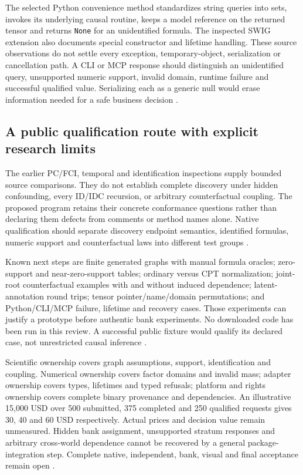 The selected Python convenience method standardizes string queries into
sets, invokes its underlying causal routine, keeps a model reference on the
returned tensor and returns \texttt{None} for an unidentified formula.
The inspected SWIG extension also documents special constructor and lifetime
handling. These source observations do not settle every exception,
temporary-object, serialization or cancellation path. A CLI or MCP response
should distinguish an unidentified query, unsupported numeric support,
invalid domain, runtime failure and successful qualified value. Serializing
each as a generic null would erase information needed for a safe business
decision \cite{exec24_agrum_source,exec24_agrum_choice}.

\subsection{A public qualification route with explicit research limits}
The earlier PC/FCI, temporal and identification inspections supply bounded
source comparisons. They do not establish complete discovery under hidden
confounding, every ID/IDC recursion, or arbitrary counterfactual coupling.
The proposed program retains their concrete conformance questions rather
than declaring them defects from comments or method names alone. Native
qualification should separate discovery endpoint semantics, identified
formulas, numeric support and counterfactual laws into different test groups
\cite{exec13_cxx_agrum,exec14_native_agrum,exec16_ct_agrum,
exec19_cxx_identification_source,exec24_agrum_choice}.

Known next steps are finite generated graphs with manual formula oracles;
zero-support and near-zero-support tables; ordinary versus CPT normalization;
joint-root counterfactual examples with and without induced dependence;
latent-annotation round trips; tensor pointer/name/domain permutations;
and Python/CLI/MCP failure, lifetime and recovery cases. Those experiments
can justify a prototype before authentic bank experiments. No downloaded
code has been run in this review. A successful public fixture would qualify
its declared case, not unrestricted causal inference
\cite{exec24_agrum_choice}.

Scientific ownership covers graph assumptions, support, identification and
coupling. Numerical ownership covers factor domains and invalid mass;
adapter ownership covers types, lifetimes and typed refusals; platform and
rights ownership covers complete binary provenance and dependencies.
An illustrative 15,000 USD over 500 submitted, 375 completed and 250
qualified requests gives 30, 40 and 60 USD respectively. Actual prices and
decision value remain unmeasured. Hidden bank assignment, unsupported
stratum responses and arbitrary cross-world dependence cannot be recovered
by a general package-integration step. Complete native, independent, bank,
visual and final acceptance remain open \cite{exec24_agrum_choice}.
